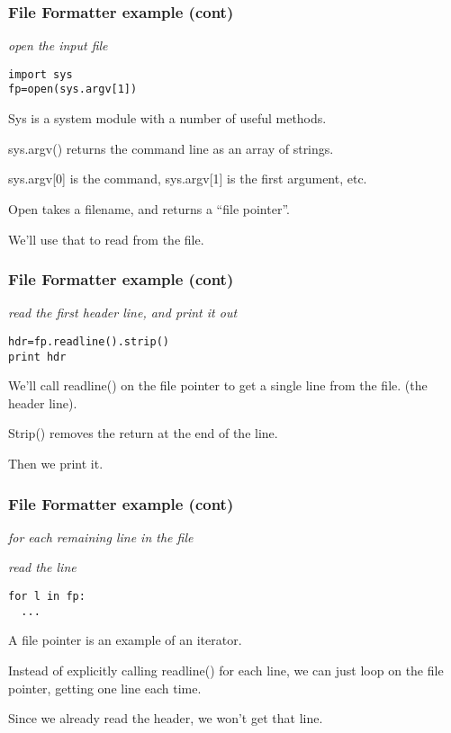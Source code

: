 \documentclass[10pt]{beamer}
\begin{document}
\begin{frame}[fragile]
\frametitle{File Formatter example (cont)}

\textit{open the input file}

\begin{verbatim}
import sys
fp=open(sys.argv[1])
\end{verbatim}

Sys is a system module with a number of useful methods.  
\vspace{2mm}

sys.argv() returns the command line as an array of strings.  
\vspace{2mm}

sys.argv[0] is the command, sys.argv[1] is the first
argument, etc.
\vspace{2mm}

Open takes a filename, and returns a ``file pointer''.  
\vspace{2mm}

We'll use that to read from the file.

\end{frame}

\begin{frame}[fragile]
\frametitle{File Formatter example (cont)}

\textit{read the first header line, and print it out}

\begin{verbatim}
hdr=fp.readline().strip()
print hdr
\end{verbatim}

We'll call readline() on the file pointer to get a single line from the file.
(the header line).  
\vspace{2mm}

Strip() removes the return at the end of the line.
\vspace{2mm}

Then we print it.

\end{frame}

\begin{frame}[fragile]
\frametitle{File Formatter example (cont)}

\textit{for each remaining line in the file}

\textit{read the line}


\begin{verbatim}
for l in fp:
  ...
\end{verbatim}

A file pointer is an example of an iterator.  
\vspace{2mm}

Instead of explicitly calling readline() for each line, we can just loop on the file 
pointer, getting one line each time. 
\vspace{2mm}

Since we already read the header, we 
won't get that line.

\end{frame}
\end{document}
